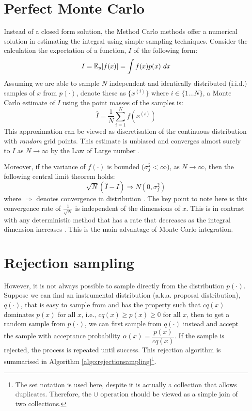 \section{Perfect Monte Carlo}
Instead of a closed form solution, the Method Carlo methods offer a numerical solution in estimating the integral using simple sampling techniques. Consider the calculation the expectation of a function, $I$ of the following form:
\begin{equation}
  I = \operatorname{\mathbb{E}}_p[f(x)] = \int f(x)p(x)~dx
\label{eq:expectation}
\end{equation}
Assuming we are able to sample $N$ independent and identically distributed (i.i.d.) samples of $x$ from $p(\cdot)$, denote these as $\{x^{(i)}\}$ where $i \in \{1 \ldots N\}$, a Monte Carlo estimate of $I$ using the point masses of the samples is:
\begin{equation}
  \hat{I} = \frac{1}{N} \sum^N_{i=1} f(x^{(i)})
\end{equation}
This approximation can be viewed as discretisation of the continuous distribution with \emph{random} grid points. This estimate is unbiased and converges almost surely to $I$ as $N \to \infty$ by the Law of Large number \cite{RCP05}. 

Moreover, if the variance of $f(\cdot)$ is bounded ($\sigma^2_f < \infty$), as $N \to \infty$, then the following central limit theorem holds:
\begin{equation}
  \sqrt{N}(\hat{I} - I) \Longrightarrow N(0, \sigma^2_f)
\end{equation}
where $\Longrightarrow$ denotes convergence in distribution \cite{AD09}. The key point to note here is this convergence rate of $\frac{1}{\sqrt{N}}$ is independent of the dimensions of $x$. This is in contrast with any deterministic method that has a rate that decreases as the integral dimension increases \cite{RCP05}. This is the main advantage of Monte Carlo integration.

\section{Rejection sampling}
However, it is not always possible to sample directly from the distribution $p(\cdot)$. Suppose we can find an instrumental distribution (a.k.a. proposal distribution), $q(\cdot)$, that is easy to sample from and has the property such that $cq(x)$ dominates $p(x)$ for all $x$, i.e., $cq(x) \geq p(x) \geq 0$ for all $x$, then to get a random sample from $p(\cdot)$, we can first sample from $q(\cdot)$ instead and accept the sample with acceptance probability $\alpha(x)=\dfrac{p(x)}{cq(x)}$. If the sample is rejected, the process is repeated until success. This rejection algorithm is summarised in Algorithm \ref{algo:rejectionsampling}\footnote{The set notation is used here, despite it is actually a collection that allows duplicates. Therefore, the $\cup$ operation should be viewed as a simple join of two collections.}.

